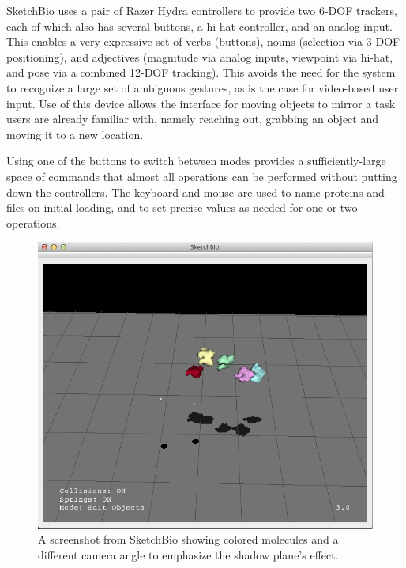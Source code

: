 \documentclass[twocolumn]{bmcart}%
\begin{document}
SketchBio uses a pair of Razer Hydra controllers to provide two 6-DOF trackers, each of which also has several buttons, a hi-hat controller, and an analog input.
This enables a very expressive set of verbs (buttons), nouns (selection via 3-DOF positioning), and adjectives (magnitude via analog inputs, viewpoint via hi-hat, and pose via a combined 12-DOF tracking).
This avoids the need for the system to recognize a large set of ambiguous gestures, as is the case for video-based user input.
Use of this device allows the interface for moving objects to mirror a task users are already familiar with, namely reaching out, grabbing an object and moving it to a new location.

Using one of the buttons to switch between modes provides a sufficiently-large space of commands that almost all operations can be performed without putting down the controllers.
The keyboard and mouse are used to name proteins and files on initial loading, and to set precise values as needed for one or two operations.

\begin{figure}[h]
\centering
\includegraphics[width=0.9\columnwidth]{shadow_plane.png}
\caption{A screenshot from SketchBio showing colored molecules and a different camera angle to emphasize the shadow plane's effect.}
\label{fig:shadow_plane}
\end{figure}
\end{document}
